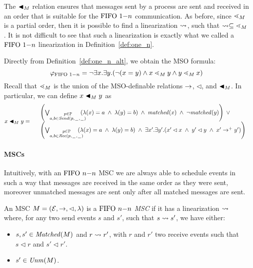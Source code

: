 The ${\blacktriangleleft}_M$ relation ensures that messages sent by a process are sent and received in an order that is suitable for the $\text{FIFO } 1\mathsf{-}n$ communication. As before, since ${\lessdot_M}$ is a partial order, then it is possible to find a linearization $\rightsquigarrow$, such that $\rightsquigarrow \subseteq \lessdot_M$. It is not difficult to see that such a linearization is exactly what we called a $\text{FIFO } 1\mathsf{-}n$ linearization in Definition~\ref{def:one_n}. 

Directly from  Definition~\ref{def:one_n_alt}, we obtain the MSO formula:
\[
	\varphi_{\text{FIFO } 1\mathsf{-}n} = \neg \exists x.\exists y.(\neg (x = y) \wedge x \lessdot_M y \wedge y \lessdot_M x)
\]
Recall that $\lessdot_M$ is the union of the MSO-definable relations $\to$, $\lhd$, and $\blacktriangleleft_M$. In particular, we can define $x \blacktriangleleft_M y$ as 
\[
x \blacktriangleleft_M y =
\begin{array}{rl}
& \left(
	\bigvee_{\substack{p \in \mathbb{P}\\a,b \in {\mathit{Send}(p,\hspace{0.1em}\underline{\hspace{0.5em}}\hspace{0.1em},\hspace{0.1em}\underline{\hspace{0.5em}}\hspace{0.1em})}}}\hspace{-1em}
	(\lambda(x) = a \;\wedge\; \lambda(y) = b)
	\;\wedge\; \mathit{matched}(x) \;\wedge\; \neg \mathit{matched}(y)
\right) \;\vee\\
& \left(
	\bigvee_{\substack{p \in \mathbb{P}\\a,b \in {\mathit{Rec}(p,\hspace{0.1em}\underline{\hspace{0.5em}}\hspace{0.1em},\hspace{0.1em}\underline{\hspace{0.5em}}\hspace{0.1em})}}}\hspace{-1em}
	(\lambda(x) = a \;\wedge\; \lambda(y) = b)
	\;\wedge\; 
	\exists x'.\exists y'. (x' \lhd x \;\wedge\; y' \lhd y \;\wedge\; x' \to^+ y')
\right)\\
\end{array}
\]


\paragraph{\bf \nn MSCs}
Intuitively, with an $\nn$ MSC we are always able to schedule events in such a way that messages are received in the same order as they were sent, moreover unmatched messages are sent only after all matched messages are sent. 
\begin{definition}[$\nn$ MSC]\label{def:n_n}
	An MSC $M = (\mathcal{E},\to,\lhd,\lambda)$ is a \emph{$\nn$ MSC} if it has a linearization $\rightsquigarrow$ where, for any two send events $s$ and $s'$, such that $s \rightsquigarrow s'$, we have either:
	\begin{itemize}%
		\item $s,s' \in \mathit{Matched}(M)$ and $r \rightsquigarrow r'$, with $r$ and $r'$  two receive events such that $s \lhd r$ and $s' \lhd r'$.
		\item $s' \in \mathit{Unm}(M)$.
	\end{itemize}
\end{definition}

